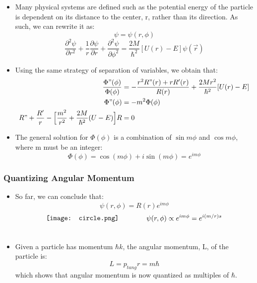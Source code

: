 \documentclass[12pt, letterpaper, twoside]{article}
\begin{document}
\begin{itemize}
    \item Many physical systems are defined such as the potential energy of the particle is dependent on its distance to the center, r, rather than its direction. As such, we can rewrite it as:
    \begin{equation*}
        \psi = \psi(r, \phi)
    \end{equation*}
    \begin{equation}
        \frac{\partial^2\psi}{\partial r^2} + \frac{1}{r}\frac{\partial\psi}{\partial r} + \frac{\partial^2\psi}{\partial \phi^2} = \frac{2M}{\hbar^2}[U(r) - E]\psi(\vec{r})
    \end{equation}
    \item Using the same strategy of separation of variables, we obtain that:
    \begin{align*}
        \frac{\Phi"(\phi)}{\Phi(\phi)} &= - \frac{r^2R"(r) + rR'(r)}{R(r)} + \frac{2Mr^2}{\hbar^2}[U(r) - E]\\
        \Phi"(\phi) &= -m^2\Phi(\phi) \\
        R" + \frac{R'}{r} - \Big[\frac{m^2}{r^2} + \frac{2M}{\hbar^2}(U - E)\Big]R &= 0
    \end{align*}
    \item The general solution for $\Phi(\phi)$ is a combination of $\sin{m\phi}$ and $\cos{m\phi}$, where m must be an integer:
    \begin{equation*}
        \Phi(\phi) = \cos{(m\phi)} + i\sin{(m\phi)} = e^{im\phi}
    \end{equation*}
\end{itemize}
\subsubsection{Quantizing Angular Momentum}

\begin{itemize}
    \item So far, we can conclude that:
    \begin{equation*}
        \psi(r, \phi) = R(r)e^{im\phi}
    \end{equation*}
    \begin{align}
        \vcenter{\hbox{\texttt{[image: circle.png]}}}
        &\qquad\qquad
        \begin{aligned}
            \psi(r, \phi) \propto e^{im\phi} = e^{i(m/r)s}
        \end{aligned}\\
        \vcenter{\hbox{\begin{minipage}{4cm}
        \end{minipage}}}
        & \notag
    \end{align}
    \item Given a particle has momentum $\hbar k$, the angular momentum, L, of the particle is:
    \begin{equation*}
        L = p_{tang}r = m\hbar
    \end{equation*}
    which shows that angular momentum is now quantized as multiples of $\hbar$.
\end{itemize}
\end{document}
